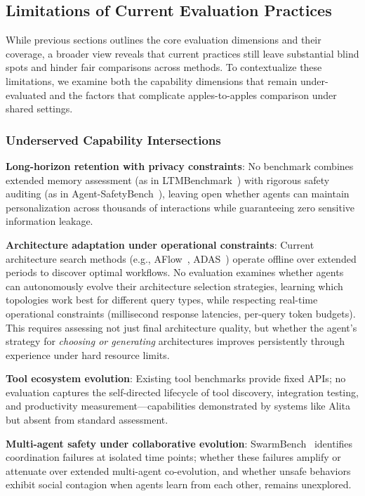 \documentclass[10pt]{article} %
\begin{document}
\subsection{Limitations of Current Evaluation Practices}

While previous sections outlines the core evaluation dimensions and their coverage, a broader view reveals that current practices still leave substantial blind spots and hinder fair comparisons across methods. To contextualize these limitations, we examine both the capability dimensions that remain under-evaluated and the factors that complicate apples-to-apples comparison under shared settings.

\subsubsection{Underserved Capability Intersections}


\textbf{Long-horizon retention with privacy constraints}: No benchmark combines extended memory assessment (as in LTMBenchmark~\citep{castillo-bolado2024beyond}) with rigorous safety auditing (as in Agent-SafetyBench~\citep{zhang2024agentsafety}), leaving open whether agents can maintain personalization across thousands of interactions while guaranteeing zero sensitive information leakage.
    
\textbf{Architecture adaptation under operational constraints}: Current architecture search methods (e.g., AFlow~\citep{zhang2024aflow}, ADAS~\citep{hu2024automated}) operate offline over extended periods to discover optimal workflows. No evaluation examines whether agents can autonomously evolve their architecture selection strategies, learning which topologies work best for different query types, while respecting real-time operational constraints (millisecond response latencies, per-query token budgets). This requires assessing not just final architecture quality, but whether the agent's strategy for \emph{choosing or generating} architectures improves persistently through experience under hard resource limits.


    
\textbf{Tool ecosystem evolution}: Existing tool benchmarks provide fixed APIs; no evaluation captures the self-directed lifecycle of tool discovery, integration testing, and productivity measurement—capabilities demonstrated by systems like Alita but absent from standard assessment.
    
\textbf{Multi-agent safety under collaborative evolution}: SwarmBench~\citep{ruan2025benchmarking} identifies coordination failures at isolated time points; whether these failures amplify or attenuate over extended multi-agent co-evolution, and whether unsafe behaviors exhibit social contagion when agents learn from each other, remains unexplored.
\end{document}
